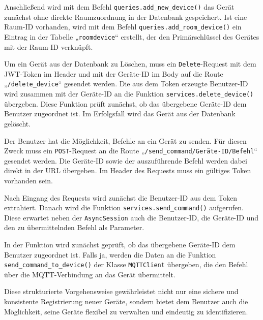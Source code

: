 \documentclass[12pt, letterpaper]{article}
\begin{document}
  \par Anschließend wird mit dem Befehl \texttt{queries.add\_new\_device()} das Gerät zunächst ohne direkte Raumzuordnung in der Datenbank gespeichert. Ist eine Raum-ID vorhanden, wird mit dem Befehl \texttt{queries.add\_room\_device()} ein Eintrag in der Tabelle „\texttt{roomdevice}“ erstellt, der den Primärschlüssel des Gerätes mit der Raum-ID verknüpft.
  \par Um ein Gerät aus der Datenbank zu Löschen, muss ein \texttt{Delete}-Request mit dem JWT-Token im Header und mit der Geräte-ID im Body auf die Route „\texttt{/delete\_device}“ gesendet werden. Die aus dem Token erzeugte Benutzer-ID wird zusammen mit der Geräte-ID an die Funktion \texttt{services.delete\_device()} übergeben. Diese Funktion prüft zunächst, ob das übergebene Geräte-ID dem Benutzer zugeordnet ist. Im Erfolgsfall wird das Gerät aus der Datenbank gelöscht. 
  \par Der Benutzer hat die Möglichkeit, Befehle an ein Gerät zu senden. Für diesen Zweck muss ein \texttt{POST}-Request an die Route „\texttt{/send\_command/Geräte-ID/Befehl}“ gesendet werden. Die Geräte-ID sowie der auszuführende Befehl werden dabei direkt in der URL übergeben. Im Header des Requests muss ein gültiges Token vorhanden sein.
  \par Nach Eingang des Requests wird zunächst die Benutzer-ID aus dem Token extrahiert. Danach wird die Funktion \texttt{services.send\_command()} aufgerufen. Diese erwartet neben der \texttt{AsyncSession} auch die Benutzer-ID, die Geräte-ID und den zu übermittelnden Befehl als Parameter.
  \par In der Funktion wird zunächst geprüft, ob das übergebene Geräte-ID dem Benutzer zugeordnet ist. Falls ja, werden die Daten an die Funktion \texttt{send\_command\_to\_device()} der Klasse \texttt{MQTTClient} übergeben, die den Befehl über die MQTT-Verbindung an das Gerät übermittelt.
  \par Diese strukturierte Vorgehensweise gewährleistet nicht nur eine sichere und konsistente Registrierung neuer Geräte, sondern bietet dem Benutzer auch die Möglichkeit, seine Geräte flexibel zu verwalten und eindeutig zu identifizieren.
\end{document}
